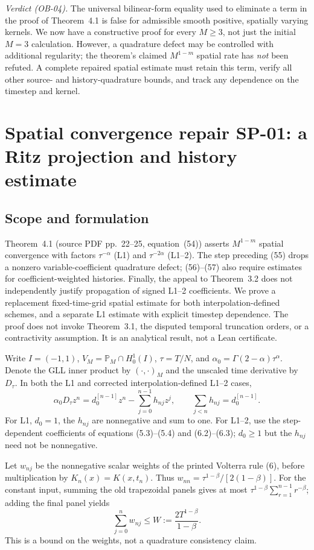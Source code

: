 \documentclass[11pt,a4paper]{amsart}
\theoremstyle{remark}
\theoremstyle{plain}
\theoremstyle{remark}
\numberwithin{equation}{section}
\begin{document}
\noindent\emph{Verdict (OB-04).} The universal bilinear-form equality used to eliminate a term in the proof of Theorem~4.1 is false for admissible smooth positive, spatially varying kernels. We now have a constructive proof for every $M\ge3$, not just the initial $M=3$ calculation. However, a quadrature defect may be controlled with additional regularity; the theorem's claimed $M^{1-m}$ spatial rate has \emph{not} been refuted. A complete repaired spatial estimate must retain this term, verify all other source- and history-quadrature bounds, and track any dependence on the timestep and kernel.


\section{Spatial convergence repair SP-01: a Ritz projection and history estimate}
\label{sec:spatial-repair}

\subsection{Scope and formulation}
Theorem~4.1 (source PDF pp.~22--25, equation~(54)) asserts $M^{1-m}$ spatial convergence with factors $\tau^{-\alpha}$ (L1) and $\tau^{-2\alpha}$ (L1--2). The step preceding (55) drops a nonzero variable-coefficient quadrature defect; (56)--(57) also require estimates for coefficient-weighted histories. Finally, the appeal to Theorem~3.2 does not independently justify propagation of signed L1--2 coefficients. We prove a replacement fixed-time-grid spatial estimate for both interpolation-defined schemes, and a separate L1 estimate with explicit timestep dependence. The proof does not invoke Theorem~3.1, the disputed temporal truncation orders, or a contractivity assumption. It is an analytical result, not a Lean certificate.

Write $I=(-1,1)$, $V_M=\mathbb P_M\cap H_0^1(I)$, $\tau=T/N$, and $\alpha_0=\Gamma(2-\alpha)\tau^\alpha$. Denote the GLL inner product by $(\cdot,\cdot)_M$ and the unscaled time derivative by $D_\tau$. In both the L1 and corrected interpolation-defined L1--2 cases,
\[
 \alpha_0 D_\tau z^n=d_0^{[n-1]}z^n-\sum_{j=0}^{n-1}h_{nj}z^j,
 \qquad \sum_{j<n}h_{nj}=d_0^{[n-1]}.
\]
For L1, $d_0=1$, the $h_{nj}$ are nonnegative and sum to one. For L1--2, use the step-dependent coefficients of equations (5.3)--(5.4) and (6.2)--(6.3); $d_0\ge1$ but the $h_{nj}$ need not be nonnegative.

Let $w_{nj}$ be the nonnegative scalar weights of the printed Volterra rule (6), before multiplication by $K_n(x)=K(x,t_n)$. Thus $w_{nn}=\tau^{1-\beta}/[2(1-\beta)]$. For the constant input, summing the old trapezoidal panels gives at most $\tau^{1-\beta}\sum_{r=1}^{n-1}r^{-\beta}$; adding the final panel yields
\begin{equation}\label{eq:sp-weight}
 \sum_{j=0}^n w_{nj}\le W:=\frac{2T^{1-\beta}}{1-\beta}.
\end{equation}
This is a bound on the weights, not a quadrature consistency claim.
\end{document}
